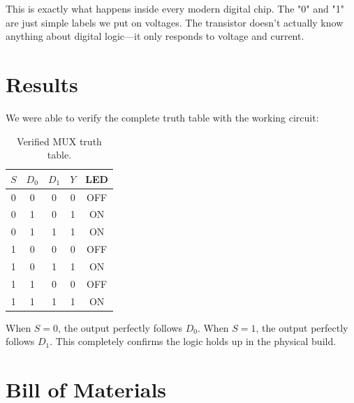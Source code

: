 \documentclass[11pt,a4paper]{article}
\begin{document}
This is exactly what happens inside every modern digital chip. The "0" and "1" are just simple labels we put on voltages. The transistor doesn't actually know anything about digital logic—it only responds to voltage and current.

\section{Results}

We were able to verify the complete truth table with the working circuit:

\begin{table}[H]
\centering
\caption{Verified MUX truth table.}
\begin{tabular}{@{}ccccc@{}}
\toprule
\textbf{$S$} & \textbf{$D_0$} & \textbf{$D_1$} & \textbf{$Y$} & \textbf{LED} \\
\midrule
0 & 0 & 0 & 0 & OFF \\
0 & 1 & 0 & 1 & ON \\
0 & 1 & 1 & 1 & ON \\
1 & 0 & 0 & 0 & OFF \\
1 & 0 & 1 & 1 & ON \\
1 & 1 & 0 & 0 & OFF \\
1 & 1 & 1 & 1 & ON \\
\bottomrule
\end{tabular}
\end{table}

When $S = 0$, the output perfectly follows $D_0$. When $S = 1$, the output perfectly follows $D_1$. This completely confirms the logic holds up in the physical build.

\section{Bill of Materials}
\end{document}

